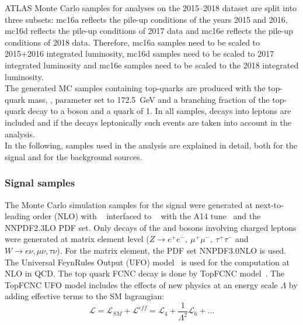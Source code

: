 ATLAS Monte Carlo samples for analyses on the 2015--2018 dataset are split into three subsets: mc16a reflects the pile-up conditions of the years 2015 and 2016, mc16d reflects the pile-up conditions of 2017 data and mc16e reflects the pile-up conditions of 2018 data. Therefore, mc16a samples need to be scaled to 2015+2016 integrated luminosity, mc16d samples need to be scaled to 2017 integrated luminosity and mc16e samples need to be scaled to the 2018 integrated luminosity.\\
The generated MC samples containing top-quarks are produced with the top-quark mass, \mtop,
parameter set to \SI{172.5}{\GeV} and a branching fraction of the top-quark decay to a \PW boson and a \Pqb quark of 1. 
In all samples, decays into \Pgt leptons are included and if the \Pgt decays leptonically such events are taken into account in the analysis.\\
In the following, samples used in the analysis are explained in detail, both for the signal and for the background sources.

\subsubsection{Signal samples}
\label{sec:samples:mc:sig}

The Monte Carlo simulation samples for the signal were generated at next-to-leading order (NLO) with \aMCatNLO~\cite{Alwall:2014hca} interfaced to \PythiaEight~\cite{Sjostrand:2007gs} with the \textsc{A14} tune~\cite{Skands:2010ak} and the \textsc{NNPDF2.3LO} PDF set. Only decays of the \PW and \PZ bosons involving charged leptons were generated at matrix element level (\mbox{$Z\to e^+e^-,~\mu^+\mu^-,~\tau^+\tau^-$} and \mbox{$W \to e\nu, \mu\nu, \tau\nu$)}. For the matrix element, the PDF set \textsc{NNPDF3.0NLO} is used. The Universal FeynRules Output (UFO) model~\cite{Alloul:2013bka} is used for the computation at NLO in QCD. The top quark FCNC decay is done by TopFCNC model~\cite{Degrande:2014tta,Durieux:2014xla}.
The TopFCNC UFO model includes the effects of new physics at an energy scale $\Lambda$ by adding effective terms to the SM lagrangian:
\begin{equation}
\mathcal{L} = \mathcal{L}_{SM} + \mathcal{L}^{eff} = \mathcal{L}_4 + \frac{1}{\Lambda^2} \mathcal{L}_6+ ...
\end{equation}

